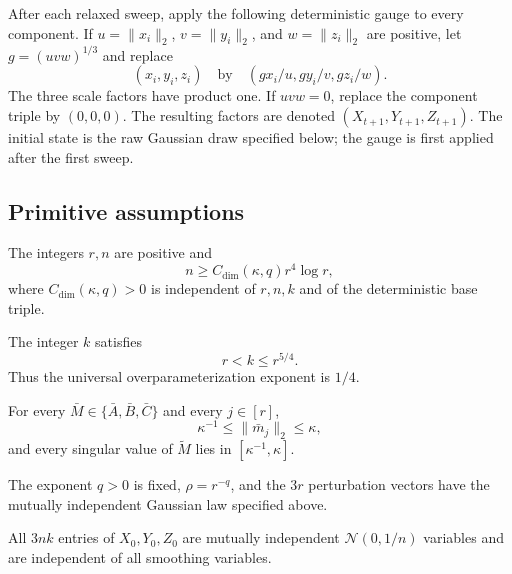 After each relaxed sweep, apply the following deterministic gauge to every
component.  If $u=\|x_i\|_2$, $v=\|y_i\|_2$, and $w=\|z_i\|_2$ are
positive, let $g=(uvw)^{1/3}$ and replace
\[
(x_i,y_i,z_i)
\quad\text{by}\quad
(gx_i/u,gy_i/v,gz_i/w).
\]
The three scale factors have product one.  If $uvw=0$, replace the component
triple by $(0,0,0)$.  The resulting factors are denoted
$(X_{t+1},Y_{t+1},Z_{t+1})$.  The initial state is the raw Gaussian draw
specified below; the gauge is first applied after the first sweep.

\subsection{Primitive assumptions}

\begin{assumption}\label{assump:dimension}
The integers $r,n$ are positive and
\[
n\geq C_{\mathrm{dim}}(\kappa,q)r^4\log r,
\]
where $C_{\mathrm{dim}}(\kappa,q)>0$ is independent of $r,n,k$ and of
the deterministic base triple.
\end{assumption}

\begin{assumption}\label{assump:rank_window}
The integer $k$ satisfies
\[
r<k\leq r^{5/4}.
\]
Thus the universal overparameterization exponent is $1/4$.
\end{assumption}

\begin{assumption}\label{assump:base_conditioning}
For every $\bar M\in\{\bar A,\bar B,\bar C\}$ and every $j\in[r]$,
\[
\kappa^{-1}\leq\|\bar m_j\|_2\leq\kappa,
\]
and every singular value of $\widetilde M$ lies in
$[\kappa^{-1},\kappa]$.
\end{assumption}

\begin{assumption}\label{assump:gaussian_smoothing}
The exponent $q>0$ is fixed, $\rho=r^{-q}$, and the $3r$ perturbation
vectors have the mutually independent Gaussian law specified above.
\end{assumption}

\begin{assumption}\label{assump:independent_initialization}
All $3nk$ entries of $X_0,Y_0,Z_0$ are mutually independent
$\mathcal N(0,1/n)$ variables and are independent of all smoothing
variables.
\end{assumption}

